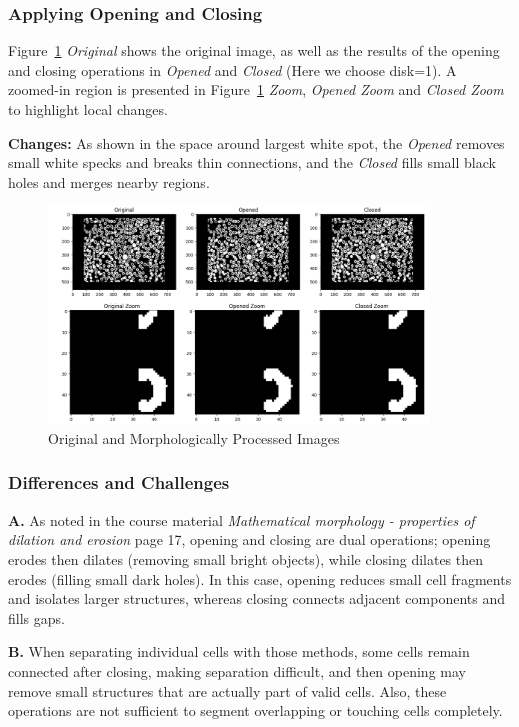 \documentclass[12pt]{article}
\begin{document}
\subsubsection{Applying Opening and Closing} %

Figure~\ref{fig:full_images} \textit{Original} shows the original image, as well as the results of the opening and closing operations in \textit{Opened} and \textit{Closed} (Here we choose disk=1). A zoomed-in region is presented in Figure~\ref{fig:full_images} \textit{Zoom}, \textit{Opened Zoom} and \textit{Closed Zoom} to highlight local changes.

\textbf{Changes: } As shown in the space around largest white spot, the \textit{Opened} removes small white specks and breaks thin connections, and the \textit{Closed} fills small black holes and merges nearby regions.

\begin{figure}[ht]
    \centering
        \includegraphics[width=0.9\textwidth]{pics/a7-4.1.1}
    \caption{Original and Morphologically Processed Images}
    \label{fig:full_images}
\end{figure}


\subsubsection{Differences and Challenges} %
\textbf{A. } As noted in the course material \textit{Mathematical morphology - properties of dilation and erosion} page 17, opening and closing are dual operations; opening erodes then dilates (removing small bright objects), while closing dilates then erodes (filling small dark holes). In this case, opening reduces small cell fragments and isolates larger structures, whereas closing connects adjacent components and fills gaps.

\textbf{B. } When separating individual cells with those methods, some cells remain connected after closing, making separation difficult, and then opening may remove small structures that are actually part of valid cells. Also, these operations are not sufficient to segment overlapping or touching cells completely.
\end{document}
